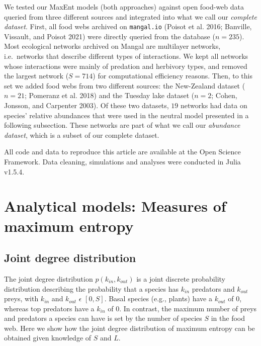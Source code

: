 \documentclass[11pt]{article}
\begin{document}
We tested our MaxEnt models (both approaches) against open food-web data
queried from three different sources and integrated into what we call
our \emph{complete dataset}. First, all food webs archived on
\texttt{mangal.io} (Poisot et al. 2016; Banville, Vissault, and Poisot
2021) were directly queried from the database (\(n = 235\)). Most
ecological networks archived on Mangal are multilayer networks,
i.e.~networks that describe different types of interactions. We kept all
networks whose interactions were mainly of predation and herbivory
types, and removed the largest network (\(S = 714\)) for computational
efficiency reasons. Then, to this set we added food webs from two
different sources: the New-Zealand dataset (\(n = 21\); Pomeranz et al.
2018) and the Tuesday lake dataset (\(n = 2\); Cohen, Jonsson, and
Carpenter 2003). Of these two datasets, \(19\) networks had data on
species' relative abundances that were used in the neutral model
presented in a following subsection. These networks are part of what we
call our \emph{abundance dataset}, which is a subset of our complete
dataset.

All code and data to reproduce this article are available at the Open
Science Framework. Data cleaning, simulations and analyses were
conducted in Julia v1.5.4.

\hypertarget{analytical-models-measures-of-maximum-entropy}{%
\section{Analytical models: Measures of maximum
entropy}\label{analytical-models-measures-of-maximum-entropy}}

\hypertarget{joint-degree-distribution}{%
\subsection{Joint degree distribution}\label{joint-degree-distribution}}

The joint degree distribution \(p(k_{in},k_{out})\) is a joint discrete
probability distribution describing the probability that a species has
\(k_{in}\) predators and \(k_{out}\) preys, with \(k_{in}\) and
\(k_{out}\) \(\epsilon\) \([0, S]\). Basal species (e.g., plants) have a
\(k_{out}\) of \(0\), whereas top predators have a \(k_{in}\) of \(0\).
In contrast, the maximum number of preys and predators a species can
have is set by the number of species \(S\) in the food web. Here we show
how the joint degree distribution of maximum entropy can be obtained
given knowledge of \(S\) and \(L\).
\end{document}

